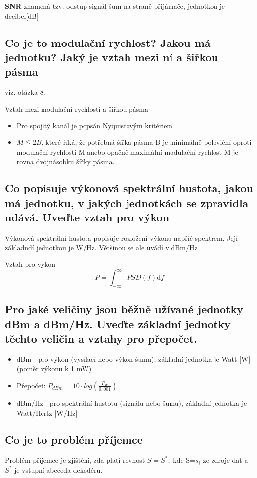 \textbf{SNR} znamená tzv. odstup signál šum na straně přijámače, jednotkou je decibel[dB]

\subsection{Co je to modulační rychlost? Jakou má jednotku? Jaký je vztah mezi ní a šiřkou pásma}
viz. otázka 8.

Vztah mezi modulační rychlostí a šiřkou pásma
\begin{itemize}
    \item Pro spojitý kanál je popsán Nyquistovým kritériem
    \item $M \leqq 2B $, které říká, že potřebná šířka pásma B je minimálně poloviční oproti modulační rychlosti M anebo opačně maximální modulační rychlost M je rovna dvojnásobku šířky pásma.
\end{itemize}

\subsection{Co popisuje výkonová spektrální hustota, jakou má jednotku, v jakých jednotkách se zpravidla udává. Uveďte vztah pro výkon}
 Výkonová spektrální hustota popisuje rozložení výkonu napříč spektrem, Její základndí jednotkou je W/Hz. Většinou se ale uvádí v dBm/Hz

Vztah pro výkon
$$P = \int_{-\infty}^{\infty} PSD(f)\mathrm{d}f$$

\subsection{Pro jaké veličiny jsou běžně užívané jednotky dBm a dBm/Hz. Uveďte základní jednotky
těchto veličin a vztahy pro přepočet.}
\begin{itemize}
    \item dBm - pro výkon (vysílací nebo výkon šumu), základní jednotka je Watt [W] (poměr výkonu k 1 mW)
    \item Přepočet: $P_{dBm}=10\cdot log\left(\frac{P_W}{0,001}\right)$
    \item dBm/Hz - pro spektrální hustotu (signálu nebo šumu), základní jednotka je Watt/Hertz [W/Hz]
\end{itemize}

\subsection{Co je to problém příjemce}
Problém příjemce je zjištění, zda platí rovnost $S=S^*, $ kde S=${s_i}$ ze zdroje dat a $S^*$ je vstupní abeceda dekodéru.


